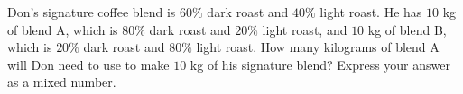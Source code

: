 Don's signature coffee blend is $60\%$ dark roast and $40\%$ light roast. He has $10$ kg of blend A, which is $80\%$ dark roast and $20\%$ light roast, and $10$ kg of blend B, which is $20\%$ dark roast and $80\%$ light roast. How many kilograms of blend A will Don need to use to make $10$ kg of his signature blend? Express your answer as a mixed number.
